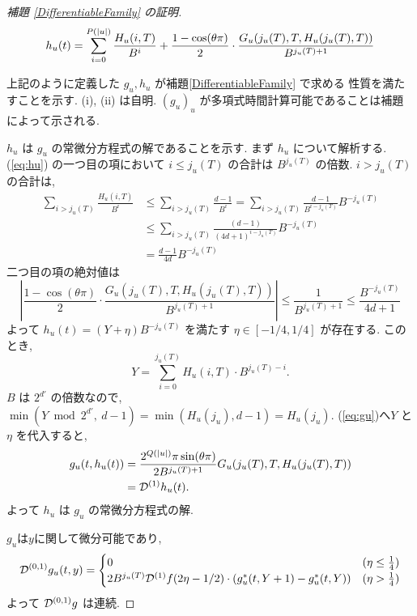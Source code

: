 \begin{proof}[\rm 補題 \ref{DifferentiableFamily} の証明]
 \begin{equation} 
  h_u(t) = \sum^{{P(|u|)}}_{i=0} \frac{H_u(i, T)}{B^i}  
  + \frac{1-\cos(\theta\pi)}{2} 
  \cdot \frac{G_u(j_u(T), T, H_u(j_u(T), T))}{B^{j_u(T)+1}} \label{eq:hu}
 \end{equation}

 上記のように定義した $g_u, h_u$ が補題\ref{DifferentiableFamily} で求める
 性質を満たすことを示す. (i), (ii) は自明. 
 $(g_u)_u$ が多項式時間計算可能であることは補題によって示される.

 $h_u$ は $g_u$ の常微分方程式の解であることを示す.
 まず $h_u$ について解析する. (\ref{eq:hu}) の一つ目の項において
 $i \le j_u(T)$ の合計は $B^{j_u(T)}$ の倍数. $i > j_u(T)$ の合計は, 
 \begin{align*}
  \sum_{i>j_u(T)} \frac{H_u(i, T)}{B^i} 
  & \le \sum_{i>j_u(T)} \frac{d-1}{B^i} 
   = \sum_{i>j_u(T)} \frac{d-1}{B^{i-j_u(T)}}B^{-j_u(T)} \\
  & \le \sum_{i>j_u(T)} \frac{(d-1)}{(4d+1)^{i-j_u(T)}}B^{-j_u(T)} \\
  & = \frac{d-1}{4d}B^{-j_u(T)}
 \end{align*}
 二つ目の項の絶対値は
 \begin{equation}
  \left| \frac{1-\cos(\theta\pi)}{2} 
   \cdot \frac{G_u(j_u(T), T, H_u(j_u(T), T))}{B^{j_u(T)+1}} \right|
  \le \frac{1}{B^{j_u(T)+1}}
  \le \frac{B^{-j_u(T)}}{4d+1}
 \end{equation}
 よって $h_u(t) = (Y + \eta) B^{-j_u(T)}$ を満たす $\eta \in [-1/4, 1/4]$
 が存在する. このとき,
 \begin{equation}
  Y = \sum_{i=0}^{j_u(T)}H_u(i, T) \cdot B^{j_u(T) - i} .
 \end{equation}
 $B$ は $2^{d'}$ の倍数なので, 
 $\min (Y \bmod 2^{d'}\!\!\!,\ d-1) = \min (H_u(j_u), d-1) = H_u(j_u)$. 
 (\ref{eq:gu})へ$Y$ と $\eta$ を代入すると,
 \begin{align*}
   g_u(t, h_u(t)) 
  & =  \frac{2^{Q(|u|)} \pi \sin(\theta\pi)}{2B^{j_u(T)+1}}
   G_u(j_u(T), T, H_u(j_u(T), T)) \\
  & =  \mathcal D^{(1)}h_u(t).
 \end{align*}
 よって $h_u$ は $g_u$ の常微分方程式の解.

 $g_u$は$y$に関して微分可能であり,
 \begin{equation}
  \mathcal D^{(0,1)} g_u(t, y)
  = \begin{cases}
     0 & (\eta \le \frac 1 4) \\
     2B^{j_u(T)}\mathcal D^{(1)}f(2\eta- 1/2)
      \cdot (g^*_u (t, Y+1)-g^*_u(t, Y))
     & (\eta > \frac 1 4)
    \end{cases}
 \end{equation}
 よって $\mathcal D^{(0,1)} g$ は連続.


\end{proof}
